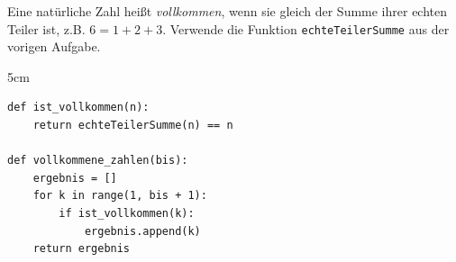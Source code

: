 \question[3]
Eine natürliche Zahl heißt \emph{vollkommen}, wenn sie gleich der Summe ihrer echten Teiler ist,
z.B. $6 = 1 + 2 + 3$. Verwende die Funktion \texttt{echteTeilerSumme} aus der vorigen Aufgabe.

\begin{solutionbox}{5cm}
\begin{lstlisting}
def ist_vollkommen(n):
    return echteTeilerSumme(n) == n

def vollkommene_zahlen(bis):
    ergebnis = []
    for k in range(1, bis + 1):
        if ist_vollkommen(k):
            ergebnis.append(k)
    return ergebnis
\end{lstlisting}
\end{solutionbox}
